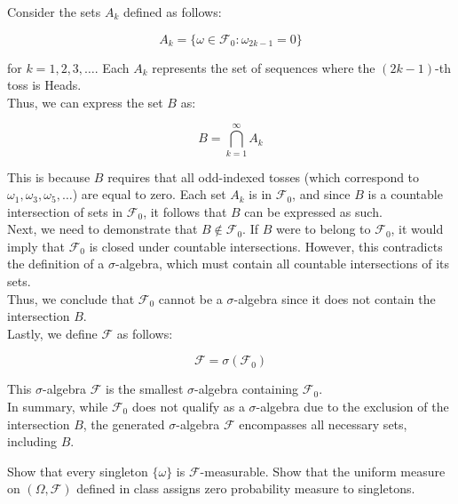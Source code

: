 \begin{solution}
    Consider the sets \( A_k \) defined as follows:

    \[
    A_k = \{ \omega \in \mathcal{F}_0 : \omega_{2k-1} = 0 \}
    \]

    for \( k = 1, 2, 3, \ldots \). Each \( A_k \) represents the set of sequences where the \( (2k-1) \)-th toss is Heads. \\

    Thus, we can express the set \( B \) as:

    \[
    B = \bigcap_{k=1}^{\infty} A_k
    \]

    This is because \( B \) requires that all odd-indexed tosses (which correspond to \( \omega_1, \omega_3, \omega_5, \ldots \)) are equal to zero. Each set \( A_k \) is in \( \mathcal{F}_0 \), and since \( B \) is a countable intersection of sets in \( \mathcal{F}_0 \), it follows that \( B \) can be expressed as such.\\

    Next, we need to demonstrate that \( B \notin \mathcal{F}_0 \). If \( B \) were to belong to \( \mathcal{F}_0 \), it would imply that \( \mathcal{F}_0 \) is closed under countable intersections. However, this contradicts the definition of a \( \sigma \)-algebra, which must contain all countable intersections of its sets.\\
    
    Thus, we conclude that \( \mathcal{F}_0 \) cannot be a \( \sigma \)-algebra since it does not contain the intersection \( B \).\\

    Lastly, we define \( \mathcal{F} \) as follows:

    \[
    \mathcal{F} = \sigma(\mathcal{F}_0)
    \]

    This \( \sigma \)-algebra \( \mathcal{F} \) is the smallest \( \sigma \)-algebra containing \( \mathcal{F}_0 \).\\
    
    In summary, while \( \mathcal{F}_0 \) does not qualify as a \( \sigma \)-algebra due to the exclusion of the intersection \( B \), the generated \( \sigma \)-algebra \( \mathcal{F} \) encompasses all necessary sets, including \( B \).
\end{solution}

\begin{exercise}
    Show that every singleton \( \{\omega\} \) is \( \mathcal{F} \)-measurable. Show that the uniform measure on \( (\Omega, \mathcal{F}) \) defined in class assigns zero probability measure to singletons.
\end{exercise}

